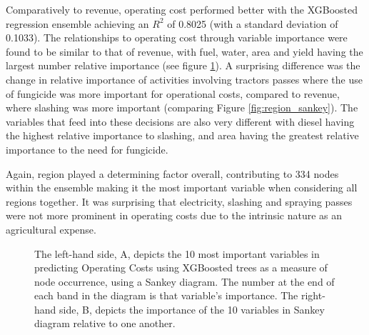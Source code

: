 \documentclass[review,12pt,authoryear]{elsarticle}
\begin{document}
\begin{linenumbers}
 
Comparatively to revenue, operating cost performed better with the XGBoosted regression ensemble achieving an $R^2$ of 0.8025 (with a standard deviation of 0.1033). The relationships to operating cost through variable importance were found to be similar to that of revenue, with fuel, water, area and yield having the largest number relative importance (see figure \ref{fig:operating_costs_sankey}). A surprising difference was the change in relative importance of activities involving tractors passes where the use of fungicide was more important for operational costs, compared to revenue, where slashing was more important (comparing Figure \ref{fig:region_sankey}). The variables that feed into these decisions are also very different with diesel having the highest relative importance to slashing, and area having the greatest relative importance to the need for fungicide.
\par
Again, region played a determining factor overall, contributing to 334 nodes within the ensemble making it the most important variable when considering all regions together. It was surprising that electricity, slashing and spraying passes were not more prominent in operating costs due to the intrinsic nature as an agricultural expense.
\par
\begin{figure}[htb]
  \caption{The left-hand side, A,  depicts the 10 most important variables in predicting Operating Costs using XGBoosted trees as a measure of node occurrence, using a Sankey diagram. The number at the end of each band in the diagram is that variable's importance. The right-hand side, B, depicts the importance of the 10 variables in Sankey diagram relative to one another.}\label{fig:operating_costs_sankey}
 \end{figure}



\end{linenumbers}
\end{document}
